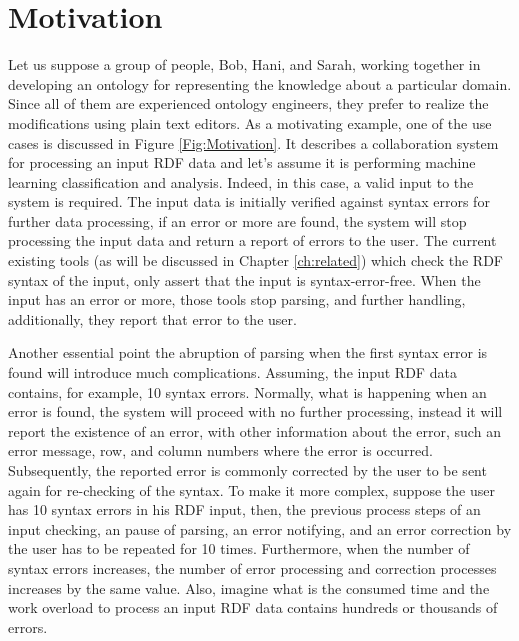 
\section{Motivation}

Let us suppose a group of people, Bob, Hani, and Sarah, working together in developing an ontology for representing the knowledge about a particular domain.
Since all of them are experienced ontology engineers, they prefer to realize the modifications using plain text editors.
As a motivating example, one of the use cases is discussed in {Figure \ref{Fig:Motivation}}. 
It describes a collaboration system for processing an input RDF data and let's assume it is performing machine learning classification and analysis. 
Indeed, in this case, a valid input to the system is required. The input data is initially verified against syntax errors for further data processing, if an error or more are found, the system will stop processing the input data and return a report of errors to the user. 
The current existing tools (as will be discussed in Chapter \ref{ch:related}) which check the RDF syntax of the input,  only assert that the input is  syntax-error-free. When the input has an error or more, those tools stop  parsing, and further handling, additionally, they report that error to the user. 

Another essential point the abruption of parsing when the first syntax error is found will introduce much complications. Assuming, the input RDF data contains, for example, 10 syntax errors. Normally, what is happening when an error is found, the system will proceed with no further processing, instead it will report the existence of an error, with other information about the error, such an error message, row, and column numbers where the error is occurred. Subsequently, the reported error is commonly corrected by the user to be sent again for re-checking of the syntax. To make it more complex, suppose the user has 10 syntax errors in his RDF input, then, the previous process steps of an input checking, an pause of parsing, an error notifying, and an error correction by the user has to be repeated for 10 times.  Furthermore, when the number of syntax errors increases, the number of error processing and correction processes increases by the same value. Also, imagine what is the consumed time and the work overload to process an input RDF data contains hundreds or thousands of errors.  

